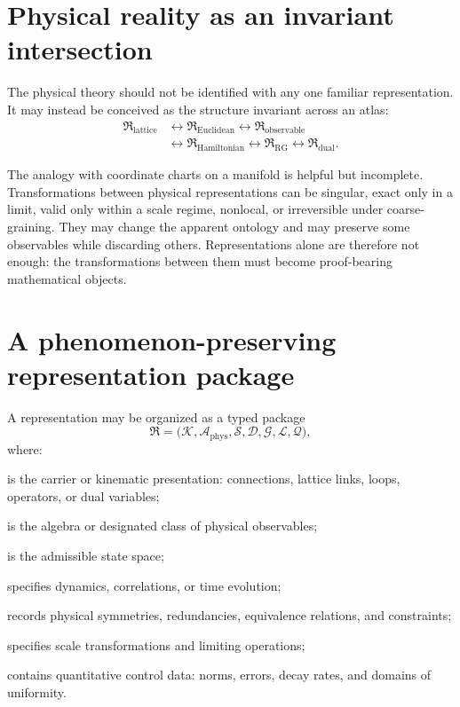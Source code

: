 \documentclass[11pt]{article}
\newcommand{\Aphys}{\mathcal{A}_{\mathrm{phys}}}
\begin{document}
\section{Physical reality as an invariant intersection}

The physical theory should not be identified with any one familiar
representation.  It may instead be conceived as the structure invariant across
an atlas:
\begin{equation}
\begin{aligned}
  \mathfrak R_{\mathrm{lattice}}
  &\longleftrightarrow
  \mathfrak R_{\mathrm{Euclidean}}
  \longleftrightarrow
  \mathfrak R_{\mathrm{observable}}\\
  &\longleftrightarrow
  \mathfrak R_{\mathrm{Hamiltonian}}
  \longleftrightarrow
  \mathfrak R_{\mathrm{RG}}
  \longleftrightarrow
  \mathfrak R_{\mathrm{dual}}.
\end{aligned}
\label{eq:atlas}
\end{equation}

The analogy with coordinate charts on a manifold is helpful but incomplete.
Transformations between physical representations can be singular, exact only
in a limit, valid only within a scale regime, nonlocal, or irreversible under
coarse-graining.  They may change the apparent ontology and may preserve some
observables while discarding others.  Representations alone are therefore not
enough: the transformations between them must become proof-bearing mathematical
objects.

\section{A phenomenon-preserving representation package}

A representation may be organized as a typed package
\begin{equation}
  \mathfrak R
  =
  \bigl(
    \mathcal K,
    \Aphys,
    \mathcal S,
    \mathcal D,
    \mathcal G,
    \mathcal L,
    \mathcal Q
  \bigr),
  \label{eq:package}
\end{equation}
where:
\begin{description}[leftmargin=2.8cm,style=nextline]
  \item[$\mathcal K$] is the carrier or kinematic presentation: connections,
    lattice links, loops, operators, or dual variables;
  \item[$\Aphys$] is the algebra or designated class of physical observables;
  \item[$\mathcal S$] is the admissible state space;
  \item[$\mathcal D$] specifies dynamics, correlations, or time evolution;
  \item[$\mathcal G$] records physical symmetries, redundancies, equivalence
    relations, and constraints;
  \item[$\mathcal L$] specifies scale transformations and limiting operations;
  \item[$\mathcal Q$] contains quantitative control data: norms, errors, decay
    rates, and domains of uniformity.
\end{description}
\end{document}
